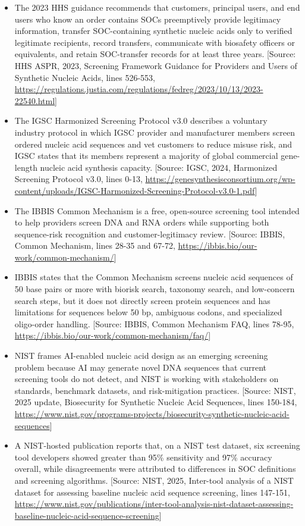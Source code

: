 \documentclass[11pt]{report}
\begin{document}
\begin{itemize}
\item The 2023 HHS guidance recommends that customers, principal users, and end users who know an order contains SOCs preemptively provide legitimacy information, transfer SOC-containing synthetic nucleic acids only to verified legitimate recipients, record transfers, communicate with biosafety officers or equivalents, and retain SOC-transfer records for at least three years. [Source: HHS ASPR, 2023, Screening Framework Guidance for Providers and Users of Synthetic Nucleic Acids, lines 526-553, \url{https://regulations.justia.com/regulations/fedreg/2023/10/13/2023-22540.html}]
\item The IGSC Harmonized Screening Protocol v3.0 describes a voluntary industry protocol in which IGSC provider and manufacturer members screen ordered nucleic acid sequences and vet customers to reduce misuse risk, and IGSC states that its members represent a majority of global commercial gene-length nucleic acid synthesis capacity. [Source: IGSC, 2024, Harmonized Screening Protocol v3.0, lines 0-13, \url{https://genesynthesisconsortium.org/wp-content/uploads/IGSC-Harmonized-Screening-Protocol-v3.0-1.pdf}]
\item The IBBIS Common Mechanism is a free, open-source screening tool intended to help providers screen DNA and RNA orders while supporting both sequence-risk recognition and customer-legitimacy review. [Source: IBBIS, Common Mechanism, lines 28-35 and 67-72, \url{https://ibbis.bio/our-work/common-mechanism/}]
\item IBBIS states that the Common Mechanism screens nucleic acid sequences of 50 base pairs or more with biorisk search, taxonomy search, and low-concern search steps, but it does not directly screen protein sequences and has limitations for sequences below 50 bp, ambiguous codons, and specialized oligo-order handling. [Source: IBBIS, Common Mechanism FAQ, lines 78-95, \url{https://ibbis.bio/our-work/common-mechanism/faq/}]
\item NIST frames AI-enabled nucleic acid design as an emerging screening problem because AI may generate novel DNA sequences that current screening tools do not detect, and NIST is working with stakeholders on standards, benchmark datasets, and risk-mitigation practices. [Source: NIST, 2025 update, Biosecurity for Synthetic Nucleic Acid Sequences, lines 150-184, \url{https://www.nist.gov/programs-projects/biosecurity-synthetic-nucleic-acid-sequences}]
\item A NIST-hosted publication reports that, on a NIST test dataset, six screening tool developers showed greater than 95\% sensitivity and 97\% accuracy overall, while disagreements were attributed to differences in SOC definitions and screening algorithms. [Source: NIST, 2025, Inter-tool analysis of a NIST dataset for assessing baseline nucleic acid sequence screening, lines 147-151, \url{https://www.nist.gov/publications/inter-tool-analysis-nist-dataset-assessing-baseline-nucleic-acid-sequence-screening}]

\end{itemize}
\end{document}
